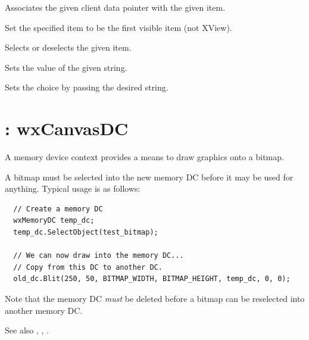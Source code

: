 

Associates the given client data pointer with the given item.




Set the specified item to be the first visible item (not XView).



Selects or deselects the given item.



Sets the value of the given string.



Sets the choice by passing the desired string.

\section{: wxCanvasDC}\label{wxmemorydc}

A memory device context provides a means to draw graphics onto a bitmap.

A bitmap must be selected into the new memory DC before it may be used
for anything.  Typical usage is as follows:

\begin{verbatim}
  // Create a memory DC
  wxMemoryDC temp_dc;
  temp_dc.SelectObject(test_bitmap);

  // We can now draw into the memory DC...
  // Copy from this DC to another DC.
  old_dc.Blit(250, 50, BITMAP_WIDTH, BITMAP_HEIGHT, temp_dc, 0, 0);
\end{verbatim}

Note that the memory DC {\it must} be deleted before a bitmap
can be reselected into another memory DC.

See also , , .

